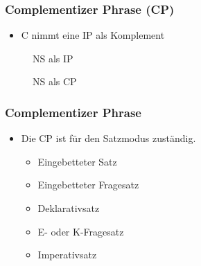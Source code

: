 \begin{frame}
\frametitle{Complementizer Phrase (CP)}

\begin{itemize}
	\item C nimmt eine IP als Komplement
\end{itemize}

\begin{minipage}[b]{0.45\textwidth}
\begin{figure}
	\centering
		\caption{NS als IP}	
\end{figure}		
\end{minipage}  
\pause
\begin{minipage}[b]{0.45\textwidth}
\begin{figure}
	\centering
		\caption{NS als CP}	
\end{figure}		
\end{minipage}  

\nocite{Fries&MyP16i}

\end{frame}


\begin{frame}
\frametitle{Complementizer Phrase}

\begin{itemize}
	\item Die CP ist für den Satzmodus zuständig.
	\begin{itemize}
		\item Eingebetteter Satz
		\item Eingebetteter Fragesatz
		\item Deklarativsatz
		\item E- oder K-Fragesatz
		\item Imperativsatz
	\end{itemize}
\end{itemize}
\end{frame}


